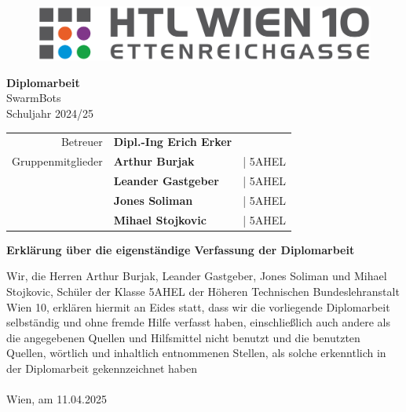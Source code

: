 \documentclass[12pt]{article}
\begin{document}
	
	
	\begin{titlepage}
		\centering
		\Huge
		\begin{figure}[H]
			\includegraphics[width=1\textwidth, center]{img/HTL_Logo.png}
		\end{figure}
		\textbf{Diplomarbeit} \\
		\vspace{5mm}
		\huge
		SwarmBots \\ 
		\vspace{5mm} 
		Schuljahr 2024/25 \\
		\vspace{2cm}
		\Large
		\begin{tabular}{r @{: } >{\bfseries} l r}
			\vspace{3mm}
			Betreuer & Dipl.-Ing Erich Erker\\
			Gruppenmitglieder & Arthur Burjak & | 5AHEL\\
			& Leander Gastgeber & | 5AHEL\\
			& Jones Soliman & | 5AHEL\\
			& Mihael Stojkovic & | 5AHEL 
	\end{tabular}
	\end{titlepage}
	\newpage
	\centering
	\LARGE
	\textbf{Erklärung über die eigenständige Verfassung der Diplomarbeit}

	\justify 
	\Large
	Wir, die Herren Arthur Burjak, Leander Gastgeber, Jones Soliman und Mihael Stojkovic, Schüler
	der Klasse 5AHEL der Höheren Technischen Bundeslehranstalt Wien 10, erklären hiermit an
	Eides statt, dass wir die vorliegende Diplomarbeit selbständig und ohne fremde Hilfe verfasst
	haben, einschließlich auch andere als die angegebenen Quellen und Hilfsmittel nicht benutzt
	und die benutzten Quellen, wörtlich und inhaltlich entnommenen Stellen, als solche
	erkenntlich in der Diplomarbeit gekennzeichnet haben
	\\
	\vspace{5mm}
	\\
	Wien, am 11.04.2025
	\vspace{8mm} \\
\end{document}
